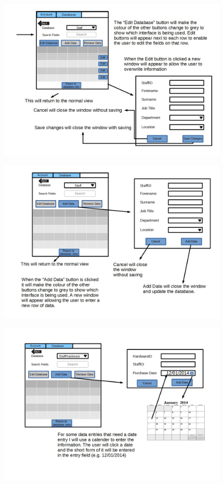 \begin{figure}[H]
\includegraphics[width=\textwidth,angle=90]{GUI_Design11.jpg}
\caption{}
\end{figure}

\begin{figure}[H]
\includegraphics[width=\textwidth,angle=90]{GUI_Design12.jpg}
\caption{}
\end{figure}

\begin{figure}[H]
\includegraphics[width=\textwidth,angle=90]{GUI_Design13.jpg}
\caption{}
\end{figure}

